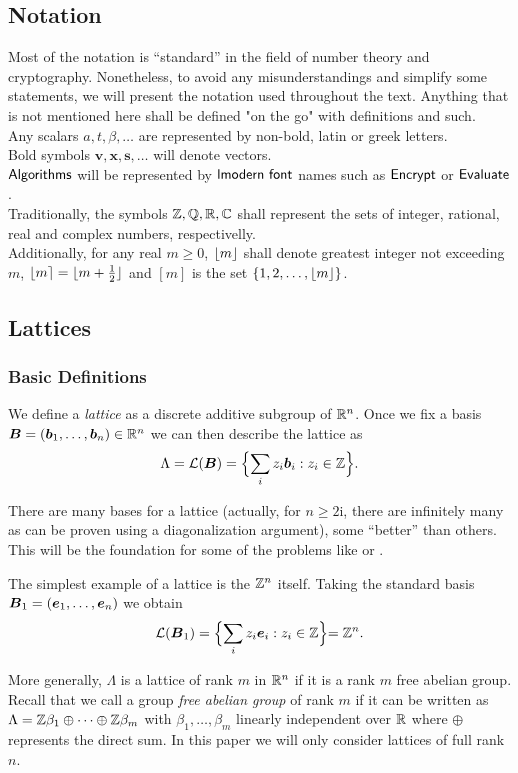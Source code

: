 \subsection{Notation}
Most of the notation is ``standard'' in the field of number theory and cryptography. Nonetheless, to avoid any misunderstandings and simplify some statements, we will present the notation used throughout the text. Anything that is not mentioned here shall be defined "on the go" with definitions and such. \\

\noindent Any scalars $a, t, \beta, \dots$ are represented by non-bold, latin or greek letters.\\
Bold symbols $\bm{v}, \bm{x}, \bm{s}, \dots$ will denote vectors. \\
$\alg{Algorithms}$ will be represented by $\alg{lmodern font}$ names such as $\alg{Encrypt}$ or $\alg{Evaluate}$.\\
Traditionally, the symbols $\mathbb{Z}, \mathbb{Q}, \mathbb{R}, \mathbb{C}$ shall represent the sets of integer, rational, real and complex numbers, respectivelly.\\
Additionally, for any real $m \geq 0$, $\lfloor m \rfloor$ shall denote greatest integer not exceeding $m$, $\lfloor m \rceil = \lfloor m + \frac{1}{2} \rfloor$ and $[m]$ is the set $\{1, 2, \dots, \lfloor m \rfloor\}$.

\subsection{Lattices}
\subsubsection*{Basic Definitions}
We define a \textit{lattice} as a discrete additive subgroup of $\mathbb{R}^n$. Once we fix a basis $\boldsymbol{B} = (\boldsymbol{b}_1, \dots ,\boldsymbol{b}_n) \in \mathbb{R}^n$ we can then describe the lattice as
$$ \Lambda = \mathcal{L}(\boldsymbol{B}) = \Bigl\{ \sum_i z_i \boldsymbol{b}_i : z_i \in \mathbb{Z} \Bigl\}.$$

There are many bases for a lattice (actually, for $n \geq 2$i, there are infinitely many as can be proven using a diagonalization argument), some ``better'' than others. This will be the foundation for some of the problems like  or .

\begin{example}
    The simplest example of a lattice is the $\mathbb{Z}^n$ itself. Taking the standard basis $\boldsymbol{B}_1 = (\boldsymbol{e}_1, \dots, \boldsymbol{e}_n)$ we obtain
$$\mathcal{L}(\boldsymbol{B}_1) = \Bigl\{ \sum_i z_i \boldsymbol{e}_i : z_i \in \mathbb{Z} \Bigl\} = \mathbb{Z}^n.$$
\end{example}
More generally, $\Lambda$ is a lattice of rank $m$ in $\mathbb{R}^n$ if it is a rank $m$ free abelian group. Recall that we call a group \textit{free abelian group} of rank $m$ if it can be written as $\Lambda = \mathbb{Z}\beta_1 \oplus \cdots \oplus\mathbb{Z}\beta_m$ with $\beta_1, \dots, \beta_m$ linearly independent over $\mathbb{R}$ where $\oplus$ represents the direct sum. In this paper we will only consider lattices of full rank $n$. 

